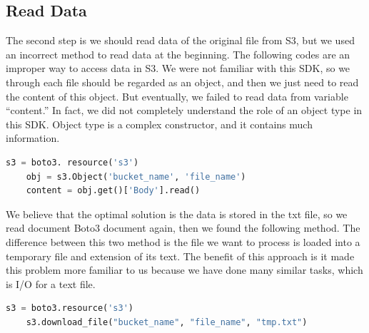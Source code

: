 \subsection{Read Data}
\noindent The second step is we should read data of the original file from S3, but we used an incorrect method to read data at the beginning. The following codes are an improper way to access data in S3. We were not familiar with this SDK, so we through each file should be regarded as an object, and then we just need to read the content of this object. But eventually, we failed to read data from variable “content.”  In fact, we did not completely understand the role of an object type in this SDK. Object type is a complex constructor, and it contains much information.\\
\begin{lstlisting}[language=Python, caption=inappropriate method to access S3 and read data]
	s3 = boto3. resource('s3')
	obj = s3.Object('bucket_name', 'file_name')
	content = obj.get()['Body'].read()  
\end{lstlisting}

\noindent We believe that the optimal solution is the data is stored in the txt file, so we read document Boto3 document again, then we found the following method. The difference between this two method is the file we want to process is loaded into a temporary file and extension of its text. The benefit of this approach is it made this problem more familiar to us because we have done many similar tasks, which is I/O for a text file.\\ 
\begin{lstlisting}[language=Python, caption=appropriate method to access S3 and read data]
	s3 = boto3.resource('s3')
	s3.download_file("bucket_name", "file_name", "tmp.txt") 
\end{lstlisting}

